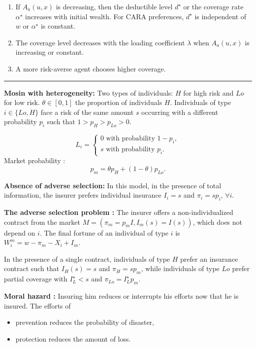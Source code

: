 \begin{f}
\begin{enumerate}
	\item If \(A_a(u, x)\) is decreasing, then the deductible level \(d^\star\) or the coverage rate \(\alpha^\star\) increases with initial wealth.
	For CARA preferences, \(d^\star\) is independent of \(w\) or \(\alpha^\star\) is constant.
	
	\item The coverage level decreases with the loading coefficient \(\lambda\) when \(A_a(u, x)\) is increasing or constant.
	
	\item A more risk-averse agent chooses higher coverage.
\end{enumerate}
\end{f}

\hrule

\begin{f}
	
	\textbf{Mosin with heterogeneity:} Two types of individuals: $H$ for high risk and $Lo$ for low risk. $\theta \in[0,1]$ the proportion of individuals $H$. Individuals of type $i \in\{Lo, H\}$ face a risk of the same amount $s$ occurring with a different probability $p_{i}$ such that $1>p_{H}>p_{Lo}>0$.
	
	$$
	L_{i}=\left\{\begin{array}{l}
		0 \text { with probability } 1-p_{i}, \\
		s \text { with probability } p_{i} .
	\end{array}\right.
	$$
Market probability :
	$$
	p_{m}=\theta p_{H}+(1-\theta) p_{Lo} .
	$$
\medskip

\textbf{Absence of adverse selection:} In this model, in the presence of total information, the insurer prefers individual insurance $I_{i}=s$ and $\pi_{i}=s p_{i}$, $\forall i$.

\textbf{The adverse selection problem : }
The insurer offers a non-individualized contract from the market $M=\left(\pi_{m}=p_{m} I, I_{m}(s)=I(s)\right)$, which does not depend on $i$. The final fortune of an individual of type $i$ is $W_{i}^{m}=w-\pi_{m}-X_{i}+I_{m}$.

In the presence of a single contract, individuals of type $H$ prefer an insurance contract such that $I_{H}(s)=s$ and $\pi_{H}=s p_{m}$, while individuals of type $Lo$ prefer partial coverage with $I_{L}^{\star}<s$ and $\pi_{Lo}=I_{L}^{\star} p_{m}$.
\medskip

\textbf{Moral hazard :}
Insuring him reduces or interrupts his efforts now that he is insured. The efforts of
\begin{itemize}
	\item prevention reduces the probability of disaster,
	\item protection reduces the amount of loss.
\end{itemize}


\end{f}
